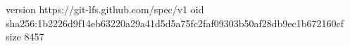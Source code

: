 version https://git-lfs.github.com/spec/v1
oid sha256:1b2226d9f14eb63220a29a41d5d5a75fc2faf09303b50af28db9ec1b672160cf
size 8457
